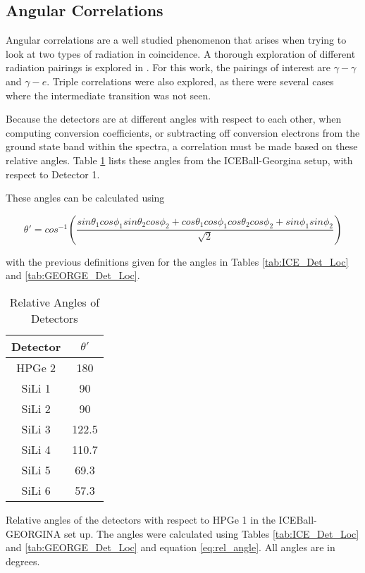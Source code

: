 \subsection{Angular Correlations}

Angular correlations are a well studied phenomenon that arises when trying to look at two types of radiation in coincidence. A thorough exploration of different radiation pairings is explored in \citep{biedenharn53:_theory_angular_corr}. For this work, the pairings of interest are $\gamma-\gamma$ and $\gamma-e$. Triple correlations were also explored, as there were several cases where the intermediate transition was not seen.

Because the detectors are at different angles with respect to each other, when computing conversion coefficients, or subtracting off conversion electrons from the ground state band within the spectra, a correlation must be made based on these relative angles. Table \ref{tab:rel_angle} lists these angles from the ICEBall-Georgina setup, with respect to Detector 1.

These angles can be calculated using

\begin{equation}
    \theta ' = cos^{-1}(\frac{sin\theta_1 cos\phi_1 sin\theta_2 cos\phi_2 +cos\theta_1 cos\phi_1 cos\theta_2 cos\phi_2 + sin\phi_1 sin\phi_2}{\sqrt{2}})
    \label{eq:rel_angle}
\end{equation}

with the previous definitions given for the angles in Tables \ref{tab:ICE_Det_Loc} and \ref{tab:GEORGE_Det_Loc}.

\begin{table}[]
    \centering
    \caption{Relative Angles of Detectors}
    \begin{tabular}{c|c} \toprule
         Detector & $\theta '$  \\
         \hline 
         HPGe 2 & 180 \\
         SiLi 1 & 90\\
         SiLi 2 & 90\\
         SiLi 3 & 122.5\\
         SiLi 4 & 110.7\\
         SiLi 5 & 69.3 \\
         SiLi 6 & 57.3 \\ \bottomrule
    \end{tabular}
    \footnotesize
    \item Relative angles of the detectors with respect to HPGe 1 in the ICEBall-GEORGINA set up. The angles were calculated using Tables \ref{tab:ICE_Det_Loc} and \ref{tab:GEORGE_Det_Loc} and equation \ref{eq:rel_angle}. All angles are in degrees.
    \label{tab:rel_angle}
\end{table}

